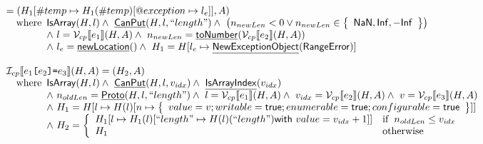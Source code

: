 \documentclass{article}
\makeatletter
\newcommand{\SF}[1]{\mbox{\textsf{#1}}}
\newcommand{\TT}[1]{\mbox{\texttt{#1}}}
\newcommand{\comment}[1]{\textit{#1}}
\newcommand{\wherec}[1]{{\rm where}\begin{array}[t]{l}#1\end{array}}
\newcommand{\ifc}[1]{{\rm if}\begin{array}[t]{l}#1\end{array}}
\newcommand{\owc}{{\rm otherwise}}
\newcommand{\I}{\mathcal{I}}
\newcommand{\V}{\mathcal{V}}
\newcommand{\set}[1]{\left\{\begin{array}{l}#1\end{array}\right\}}
\newcommand{\lbr}{\llbracket}
\newcommand{\rbr}{\rrbracket}
\newcommand{\hf}[1]{\underline{\sf #1}}
\newcommand{\exc}[1]{{\sf #1}}
\newcommand{\varloc}[1]{\##1}
\newcommand{\varprop}[1]{@#1}
\newcommand{\vtrue}{\SF{true}}
\def\inred{\color{red}}
\makeatother
\begin{document}
\[\begin{array}{ll}
 = (H_1[\varloc{temp}\mapsto H_1(\varloc{temp})[\varprop{exception}\mapsto l_{e}]], A) \\
\quad\wherec{
  \SF{IsArray}(H,l)
  \land\ \hf{CanPut}(H,l,``length")
  \land\ \left(n_{newLen} < 0 \lor n_{newLen} \in \set{\SF{NaN},\SF{Inf}, -\SF{Inf}}\right )\\
  \land\ l=\V _{cp}\lbr e_1\rbr(H,A)
  \land\ n_{newLen}=\hf{toNumber}(\V _{cp}\lbr e_2\rbr(H,A))\\
  \land\ l_e = \hf{newLocation}()
  \land\ H_1=H[l_e\mapsto\hf{NewExceptionObject}(\exc{RangeError})] \\
}\\
\\
\I _{cp}\lbr e_1\TT{[}e_2\TT{]}\TT{=}e_3 \rbr(H,A)
 = (H_2, A)\\
\quad\wherec{
  \SF{IsArray}(H,l)
  \land\ \hf{CanPut}(H,l,v_{idx})
  \land\ \hf{IsArrayIndex}(v_{idx}) \\
  \land\ n_{oldLen}=\hf{Proto}(H,l,``length")
  \land\ l=\V _{cp}\lbr e_1\rbr(H,A)
  \land\ v_{idx}=\V _{cp}\lbr e_2\rbr(H,A)
  \land\ v=\V _{cp}\lbr e_3\rbr(H,A)\\
  \land\ H_1=H[l\mapsto H(l)[n\mapsto \set{value=v;writable=\vtrue;enumerable=\vtrue;configurable=\vtrue}]] \\
  \land\ H_2= \left\{
    \begin{array}{ll}
      H_1[l\mapsto H_1(l)[``length"\mapsto H(l)(``length")\SF{with } value=v_{idx}+1]] & \ifc{n_{oldLen} \leq v_{idx}}\\
      H_1 & \owc\\
    \end{array}
  \right.
}\\
\\


\end{array}\]
\end{document}
